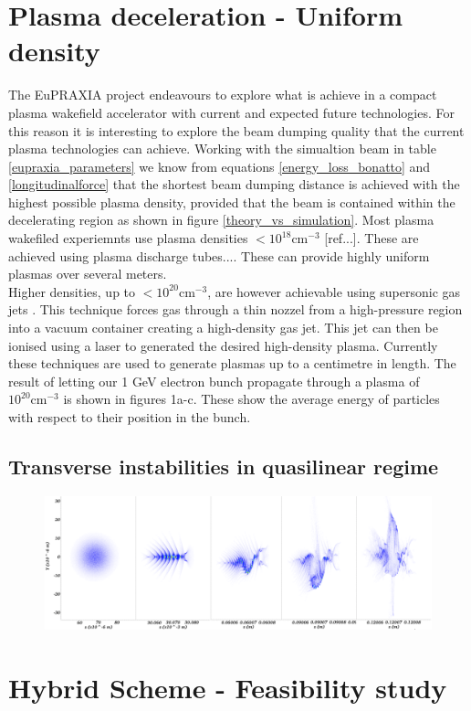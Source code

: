 \section{Plasma deceleration - Uniform density}
The EuPRAXIA project endeavours to explore what is achieve in a compact plasma wakefield accelerator with current and expected future technologies. For this reason it is interesting to explore the beam dumping quality that the current plasma technologies can achieve. Working with the simualtion beam in table \ref{eupraxia_parameters} we know from equations \ref{energy_loss_bonatto} and \ref{longitudinalforce} that the shortest beam dumping distance is achieved with the highest possible plasma density, provided that the beam is contained within the decelerating region as shown in figure \ref{theory_vs_simulation}. Most plasma wakefiled experiemnts use plasma densities $<10^18 \text{cm}^{-3}$ [ref...]. These are achieved using plasma discharge tubes.... These can provide highly uniform plasmas over several meters.\\
Higher densities, up to $<10^20 \text{cm}^{-3}$, are however achievable using supersonic gas jets \cite{Schmid2012}. This technique forces gas through a thin nozzel from a high-pressure region into a vacuum container creating a high-density gas jet. This jet can then be ionised using a laser to generated the desired high-density plasma. Currently these techniques are used to generate plasmas up to a centimetre in length. The result of letting our 1 GeV electron bunch propagate through a plasma of $10^20 \text{cm}^{-3}$ is shown in figures 1a-c. These show the average energy of particles with respect to their position in the bunch.  
\subsection{Transverse instabilities in quasilinear regime}
\begin{figure}
\centering
\includegraphics[width=\textwidth]{cherenkov_instability}
\end{figure}
\section{Hybrid Scheme - Feasibility study}

